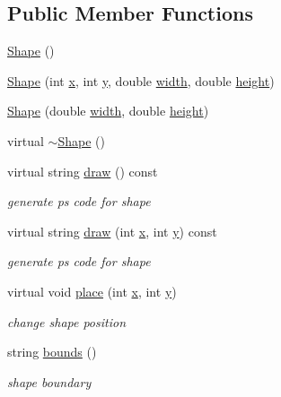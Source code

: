 \subsection*{Public Member Functions}
\begin{DoxyCompactItemize}
\item 
\hyperlink{class_shape_aaa8d87171e65e0d8ba3c5459978992a7}{Shape} ()
\item 
\hyperlink{class_shape_a06ed78198a1e3f0940d5e72006c3a074}{Shape} (int \hyperlink{class_shape_a41e403e73d2949f1a6adfba6032c41ec}{x}, int \hyperlink{class_shape_ac757f715cc5b5681f2c691663ac06f0a}{y}, double \hyperlink{class_shape_ab00e62f9f7cd0be450ac29437b80ce13}{width}, double \hyperlink{class_shape_a11686d7b1511fc6707f4dd7b74c65111}{height})
\item 
\hyperlink{class_shape_af3e449cf02a5f99a7c0d11873756b81f}{Shape} (double \hyperlink{class_shape_ab00e62f9f7cd0be450ac29437b80ce13}{width}, double \hyperlink{class_shape_a11686d7b1511fc6707f4dd7b74c65111}{height})
\item 
virtual \hyperlink{class_shape_ac3b9fc48965274893f25b18aa14ba665}{$\sim$\+Shape} ()
\item 
virtual string \hyperlink{class_shape_a8405e352e8bbbdd173fd89065d63a80b}{draw} () const 
\begin{DoxyCompactList}\small\item\em generate ps code for shape \end{DoxyCompactList}\item 
virtual string \hyperlink{class_shape_af26d06a96ece90a563795ec571451eb1}{draw} (int \hyperlink{class_shape_a41e403e73d2949f1a6adfba6032c41ec}{x}, int \hyperlink{class_shape_ac757f715cc5b5681f2c691663ac06f0a}{y}) const 
\begin{DoxyCompactList}\small\item\em generate ps code for shape \end{DoxyCompactList}\item 
virtual void \hyperlink{class_shape_a9d6b2e7274a0e1708d5ec93613b53ef2}{place} (int \hyperlink{class_shape_a41e403e73d2949f1a6adfba6032c41ec}{x}, int \hyperlink{class_shape_ac757f715cc5b5681f2c691663ac06f0a}{y})
\begin{DoxyCompactList}\small\item\em change shape position \end{DoxyCompactList}\item 
string \hyperlink{class_shape_a8b66fe7fe3e0e3ad883eb5d487d8d442}{bounds} ()
\begin{DoxyCompactList}\small\item\em shape boundary \end{DoxyCompactList}\item 

\end{DoxyCompactItemize}
